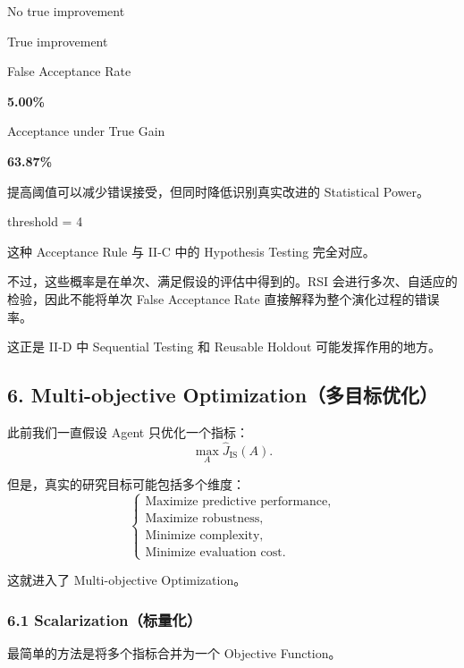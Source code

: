 
No true improvement

True improvement

False Acceptance Rate

\textbf{5.00\%}

Acceptance under True Gain

\textbf{63.87\%}

提高阈值可以减少错误接受，但同时降低识别真实改进的 Statistical Power。

threshold = 4


这种 Acceptance Rule 与 II-C 中的 Hypothesis Testing 完全对应。

不过，这些概率是在单次、满足假设的评估中得到的。RSI 会进行多次、自适应的检验，因此不能将单次 False Acceptance Rate 直接解释为整个演化过程的错误率。

这正是 II-D 中 Sequential Testing 和 Reusable Holdout 可能发挥作用的地方。

\hypertarget{part-3-40-0001-multi-objective-optimizationux591aux76eeux6807ux4f18ux5316}{%
\subsection{6. Multi-objective Optimization（多目标优化）}\label{part-3-40-0001-multi-objective-optimizationux591aux76eeux6807ux4f18ux5316}}

此前我们一直假设 Agent 只优化一个指标：
\[\max_A\widehat J_{\mathrm{IS}}(A).\]

但是，真实的研究目标可能包括多个维度：
\[\begin{cases}
\text{Maximize predictive performance},\\
\text{Maximize robustness},\\
\text{Minimize complexity},\\
\text{Minimize evaluation cost}.
\end{cases}\]

这就进入了 Multi-objective Optimization。

\hypertarget{part-3-40-0001-scalarizationux6807ux91cfux5316}{%
\subsubsection{6.1 Scalarization（标量化）}\label{part-3-40-0001-scalarizationux6807ux91cfux5316}}

最简单的方法是将多个指标合并为一个 Objective Function。

